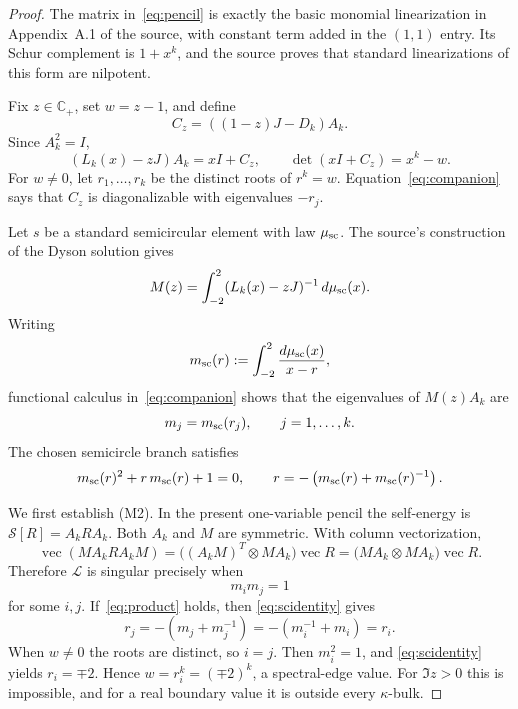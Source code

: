 \documentclass[11pt]{article}
\newcommand{\C}{\mathbb{C}}
\newcommand{\Sop}{\mathcal S}
\newcommand{\Lop}{\mathcal L}
\begin{document}
\begin{proof}
The matrix in~\eqref{eq:pencil} is exactly the basic monomial linearization in
Appendix~A.1 of the source, with constant term added in the $(1,1)$ entry.
Its Schur complement is $1+x^k$, and the source proves that standard
linearizations of this form are nilpotent.

Fix $z\in\C_+$, set $w=z-1$, and define
\[
 C_z=((1-z)J-D_k)A_k.
\]
Since $A_k^2=I$,
\begin{equation}\label{eq:companion}
 (L_k(x)-zJ)A_k=xI+C_z,
 \qquad \det(xI+C_z)=x^k-w.
\end{equation}
For $w\ne0$, let $r_1,\ldots,r_k$ be the distinct roots of $r^k=w$.
Equation~\eqref{eq:companion} says that $C_z$ is diagonalizable with
eigenvalues $-r_j$.

Let $s$ be a standard semicircular element with law $\mu_{\rm sc}$. The source's
construction of the Dyson solution gives
\[
 M(z)=\int_{-2}^2 (L_k(x)-zJ)^{-1}\,d\mu_{\rm sc}(x).
\]
Writing
\[
 m_{\rm sc}(r):=\int_{-2}^2\frac{d\mu_{\rm sc}(x)}{x-r},
\]
functional calculus in~\eqref{eq:companion} shows that the eigenvalues of
$M(z)A_k$ are
\begin{equation}\label{eq:eigenvalues}
 m_j=m_{\rm sc}(r_j),\qquad j=1,\ldots,k.
\end{equation}
The chosen semicircle branch satisfies
\begin{equation}\label{eq:scidentity}
 m_{\rm sc}(r)^2+r\,m_{\rm sc}(r)+1=0,
 \qquad r=-\left(m_{\rm sc}(r)+m_{\rm sc}(r)^{-1}\right).
\end{equation}

We first establish (M2). In the present one-variable pencil the self-energy is
$\Sop[R]=A_kRA_k$. Both $A_k$ and $M$ are symmetric. With column
vectorization,
\[
 \operatorname{vec}(M A_k R A_k M)
 =\bigl((A_kM)^T\otimes M A_k\bigr)\operatorname{vec}R
 =\bigl(MA_k\otimes MA_k\bigr)\operatorname{vec}R.
\]
Therefore $\Lop$ is singular precisely when
\begin{equation}\label{eq:product}
 m_i m_j=1
\end{equation}
for some $i,j$. If~\eqref{eq:product} holds, then
\eqref{eq:scidentity} gives
\[
 r_j=-\left(m_j+m_j^{-1}\right)
     =-\left(m_i^{-1}+m_i\right)=r_i.
\]
When $w\ne0$ the roots are distinct, so $i=j$. Then $m_i^2=1$, and
\eqref{eq:scidentity} yields $r_i=\mp2$. Hence
$w=r_i^k=(\mp2)^k$, a spectral-edge value. For $\Im z>0$ this is impossible,
and for a real boundary value it is outside every $\kappa$-bulk.


\end{proof}
\end{document}
